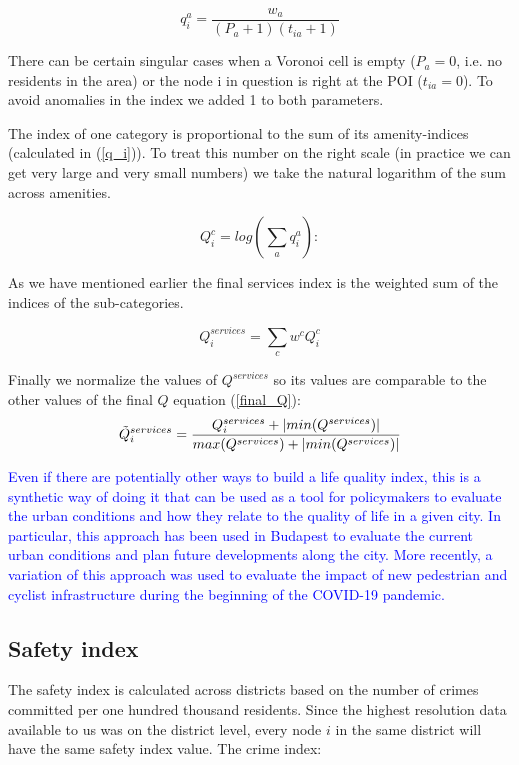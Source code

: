 \begin{equation}\label{q_i}
	q_i^a=\frac{w_{a}}{(P_a+1)(t_{ia}+1)}
\end{equation}

There can be certain singular cases when a Voronoi cell is empty ($P_a=0$, i.e. no residents in the area) or the node i in question is right at the POI ($t_{ia}=0$). To avoid anomalies in the index we added 1 to both parameters.

The index of one category is proportional to the sum of its amenity-indices (calculated in (\ref{q_i})). To treat this number on the right scale (in practice we can get very large and very small numbers) we take the natural logarithm of the sum across amenities.

\begin{equation}
	Q_i^c=log(\sum_a q_i^a):
\end{equation}

As we have mentioned earlier the final services index is the weighted sum of the indices of the sub-categories.

$$Q_i^{services} =\sum_c w^cQ_i^c $$

Finally we normalize the values of $Q^{services}$ so its values are comparable to the other values of the final $Q$ equation (\ref{final_Q}):
\begin{equation}
	\Tilde{Q}_i^{services} =\frac{Q_i^{services}+|min(Q^{services})|}{max(Q^{services})+|min(Q^{services})|}
\end{equation}

\textcolor{blue}{Even if there are potentially other ways to build a life quality index, this is a synthetic way of doing it that can be used as a tool for policymakers to evaluate the urban conditions and how they relate to the quality of life in a given city. In particular, this approach has been used in Budapest to evaluate the current urban conditions and plan future developments along the city. More recently, a variation of this approach was used to evaluate the impact of new pedestrian and cyclist infrastructure during the beginning of the COVID-19 pandemic.}

\subsection{Safety index} \label{safety}

The safety index is calculated across districts based on the number of crimes committed per one hundred thousand residents. Since the highest resolution data available to us was on the district level, every node $i$ in the same district will have the same safety index value. The crime index:

